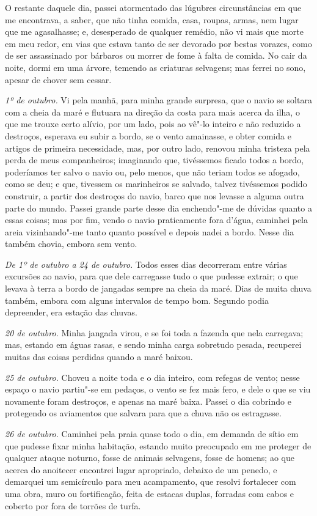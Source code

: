 O restante daquele dia, passei atormentado das lúgubres circunstâncias
em que me encontrava, a saber, que não tinha comida, casa, roupas,
armas, nem lugar que me agasalhasse; e, desesperado de qualquer remédio,
não vi mais que morte em meu redor, em vias que estava tanto de ser
devorado por bestas vorazes, como de ser assassinado por bárbaros ou
morrer de fome à falta de comida. No cair da noite, dormi em uma árvore,
temendo as criaturas selvagens; mas ferrei no sono, apesar de chover sem
cessar.

\emph{1º de outubro.} Vi pela manhã, para minha grande surpresa, que o
navio se soltara com a cheia da maré e flutuara na direção da costa para
mais acerca da ilha, o que me trouxe certo alívio, por um lado, pois ao
vê"-lo inteiro e não reduzido a destroços, esperava eu subir a bordo, se
o vento amainasse, e obter comida e artigos de primeira necessidade,
mas, por outro lado, renovou minha tristeza pela perda de meus
companheiros; imaginando que, tivéssemos ficado todos a bordo,
poderíamos ter salvo o navio ou, pelo menos, que não teriam todos se
afogado, como se deu; e que, tivessem os marinheiros se salvado, talvez
tivéssemos podido construir, a partir dos destroços do navio, barco que
nos levasse a alguma outra parte do mundo. Passei grande parte desse dia
enchendo"-me de dúvidas quanto a essas coisas; mas por fim, vendo o navio
praticamente fora d'água, caminhei pela areia vizinhando"-me tanto quanto
possível e depois nadei a bordo. Nesse dia também chovia, embora sem
vento.

\emph{De 1º de outubro a 24 de outubro}. Todos esses dias decorreram
entre várias excursões ao navio, para que dele carregasse tudo o que
pudesse extrair; o que levava à terra a bordo de jangadas sempre na
cheia da maré. Dias de muita chuva também, embora com alguns intervalos
de tempo bom. Segundo podia depreender, era estação das chuvas.

\emph{20 de outubro.} Minha jangada virou, e se foi toda a fazenda que
nela carregava; mas, estando em águas rasas, e sendo minha carga
sobretudo pesada, recuperei muitas das coisas perdidas quando a maré
baixou.

\emph{25 de outubro.} Choveu a noite toda e o dia inteiro, com refegas
de vento; nesse espaço o navio partiu"-se em pedaços, o vento se fez mais
fero, e dele o que se viu novamente foram destroços, e apenas na maré
baixa. Passei o dia cobrindo e protegendo os aviamentos que salvara para
que a chuva não os estragasse.

\emph{26 de outubro.} Caminhei pela praia quase todo o dia, em demanda
de sítio em que pudesse fixar minha habitação, estando muito preocupado
em me proteger de qualquer ataque noturno, fosse de animais selvagens,
fosse de homens; ao que acerca do anoitecer encontrei lugar apropriado,
debaixo de um penedo, e demarquei um semicírculo para meu acampamento,
que resolvi fortalecer com uma obra, muro ou fortificação, feita de
estacas duplas, forradas com cabos e coberto por fora de torrões de
turfa.

